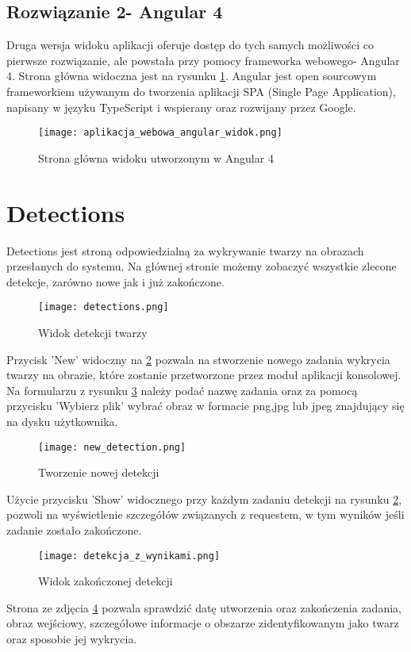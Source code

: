 \subsection{Rozwiązanie 2- Angular 4}
Druga wersja widoku aplikacji oferuje dostęp do tych samych możliwości co pierwsze rozwiązanie, ale powstała przy pomocy frameworka webowego- Angular 4. Strona główna widoczna jest na rysunku \ref{fig:strona_glowna_angular}. Angular jest open sourcowym frameworkiem używanym do tworzenia aplikacji SPA (Single Page Application), napisany w języku TypeScript i wspierany oraz rozwijany przez Google.
\begin{figure}[H]
	\centering
	\texttt{[image: aplikacja\_webowa\_angular\_widok.png]}
	\caption{Strona główna widoku utworzonym w Angular 4}
	\label{fig:strona_glowna_angular}
\end{figure}

\section{Detections}
Detections jest stroną odpowiedzialną za wykrywanie twarzy na obrazach przesłanych do systemu. Na głównej stronie możemy zobaczyć wszystkie zlecone detekcje, zarówno nowe jak i już zakończone.
\begin{figure}[H]
	\centering
	\texttt{[image: detections.png]}
	\caption{Widok detekcji twarzy}
	\label{fig:detections}
\end{figure}
Przycisk 'New' widoczny na \ref{fig:detections} pozwala na stworzenie nowego zadania wykrycia twarzy na obrazie, które zostanie przetworzone przez moduł aplikacji konsolowej. Na formularzu z rysunku \ref{fig:new_detection} należy podać nazwę zadania oraz za pomocą przycisku 'Wybierz plik' wybrać obraz w formacie png,jpg lub jpeg znajdujący się na dysku użytkownika.
\begin{figure}[H]
	\centering
	\texttt{[image: new\_detection.png]}
	\caption{Tworzenie nowej detekcji}
	\label{fig:new_detection}
\end{figure}
Użycie przycisku 'Show' widocznego przy każdym zadaniu detekcji na rysunku \ref{fig:detections}, pozwoli na wyświetlenie szczegółów związanych z requestem, w tym wyników jeśli zadanie zostało zakończone.
\begin{figure}[H]
	\centering
	\texttt{[image: detekcja\_z\_wynikami.png]}
	\caption{Widok zakończonej detekcji}
	\label{fig:detekcja_zakonczona}
\end{figure}
Strona ze zdjęcia \ref{fig:detekcja_zakonczona} pozwala sprawdzić datę utworzenia oraz zakończenia zadania, obraz wejściowy, szczegółowe informacje o obszarze zidentyfikowanym jako twarz oraz sposobie jej wykrycia.
